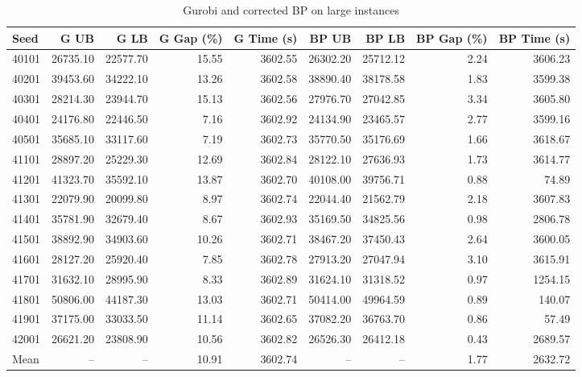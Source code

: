 \begin{table}[htbp]
\centering\small
\caption{Gurobi and corrected BP on large instances}
\begin{tabular}{lrrrrrrrr}
\toprule
Seed & G UB & G LB & G Gap (\%) & G Time (s) & BP UB & BP LB & BP Gap (\%) & BP Time (s) \\
\midrule
40101 & 26735.10 & 22577.70 & 15.55 & 3602.55 & 26302.20 & 25712.12 & 2.24 & 3606.23 \\
40201 & 39453.60 & 34222.10 & 13.26 & 3602.58 & 38890.40 & 38178.58 & 1.83 & 3599.38 \\
40301 & 28214.30 & 23944.70 & 15.13 & 3602.56 & 27976.70 & 27042.85 & 3.34 & 3605.80 \\
40401 & 24176.80 & 22446.50 & 7.16 & 3602.92 & 24134.90 & 23465.57 & 2.77 & 3599.16 \\
40501 & 35685.10 & 33117.60 & 7.19 & 3602.73 & 35770.50 & 35176.69 & 1.66 & 3618.67 \\
41101 & 28897.20 & 25229.30 & 12.69 & 3602.84 & 28122.10 & 27636.93 & 1.73 & 3614.77 \\
41201 & 41323.70 & 35592.10 & 13.87 & 3602.70 & 40108.00 & 39756.71 & 0.88 & 74.89 \\
41301 & 22079.90 & 20099.80 & 8.97 & 3602.74 & 22044.40 & 21562.79 & 2.18 & 3607.83 \\
41401 & 35781.90 & 32679.40 & 8.67 & 3602.93 & 35169.50 & 34825.56 & 0.98 & 2806.78 \\
41501 & 38892.90 & 34903.60 & 10.26 & 3602.71 & 38467.20 & 37450.43 & 2.64 & 3600.05 \\
41601 & 28127.20 & 25920.40 & 7.85 & 3602.78 & 27913.20 & 27047.94 & 3.10 & 3615.91 \\
41701 & 31632.10 & 28995.90 & 8.33 & 3602.89 & 31624.10 & 31318.52 & 0.97 & 1254.15 \\
41801 & 50806.00 & 44187.30 & 13.03 & 3602.71 & 50414.00 & 49964.59 & 0.89 & 140.07 \\
41901 & 37175.00 & 33033.50 & 11.14 & 3602.65 & 37082.20 & 36763.70 & 0.86 & 57.49 \\
42001 & 26621.20 & 23808.90 & 10.56 & 3602.82 & 26526.30 & 26412.18 & 0.43 & 2689.57 \\
Mean & -- & -- & 10.91 & 3602.74 & -- & -- & 1.77 & 2632.72 \\
\bottomrule
\end{tabular}
\end{table}